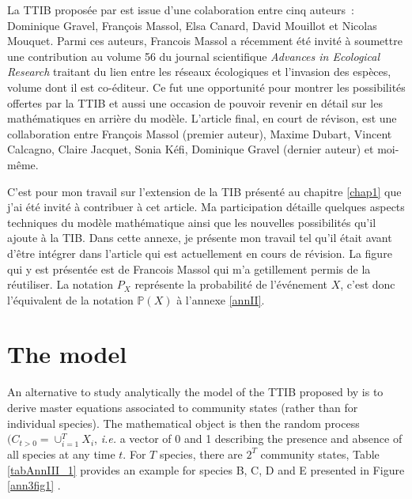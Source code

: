 \label{annIII}
\addtocounter{chapter}{1}
\setcounter{equation}{0}


La TTIB proposée par \cite{Gravel2011} est issue d'une colaboration entre cinq auteurs~:
Dominique Gravel, François Massol, Elsa Canard, David Mouillot et Nicolas Mouquet.
Parmi ces auteurs, Francois Massol a récemment été invité à soumettre une
contribution au volume 56 du journal scientifique
\emph{Advances in Ecological Research} traitant du lien entre les réseaux
écologiques et l'invasion des espèces, volume dont il est co-éditeur.
Ce fut une opportunité pour montrer les possibilités offertes par la TTIB et aussi
une occasion de pouvoir revenir en détail sur les mathématiques en arrière du modèle.
L'article final, en court de révison, est une collaboration entre François Massol
(premier auteur), Maxime Dubart, Vincent Calcagno, Claire Jacquet, Sonia Kéfi,
Dominique Gravel (dernier auteur) et moi-même.

C'est pour mon travail sur l'extension de la TIB présenté au chapitre \ref{chap1}
que j'ai été invité à contribuer à cet article. Ma participation détaille
quelques aspects techniques du modèle mathématique ainsi que les nouvelles
possibilités qu'il ajoute à la TIB.
Dans cette annexe, je présente mon travail tel qu'il était avant d'être intégrer
dans l'article qui est actuellement en cours de révision.
La figure qui y est présentée est de Francois Massol qui m'a getillement permis
de la réutiliser. La notation $P_{X}$ représente la probabilité de l'événement
$X$, c'est donc l'équivalent de la notation $\mathbb{P}(X)$ à l'annexe \ref{annII}.



\section{The model}\label{the-model}

An alternative to study analytically the model of the TTIB proposed by \cite{Gravel2011}
is to derive master equations associated to community states (rather than for individual species).
The mathematical object is then the random process
$(C_{t>0}=\cup_{i=1}^TX_i$, \emph{i.e.} a vector of 0 and 1 describing
the presence and absence of all species at any time \(t\). For \(T\)
species, there are \(2^T\) community states, Table \ref{tabAnnIII_1} provides an example
for species B, C, D and E presented in Figure \ref{ann3fig1} .


